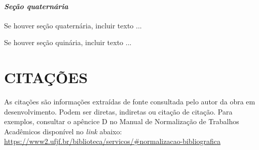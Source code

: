 \documentclass[
  oneside, %
  english,
  brazil
]{abntbibufjf}
\begin{document}









\subsubsection{\textit{Seção quaternária}}

Se houver seção quaternária, incluir texto ...



Se houver seção quinária, incluir texto ...



\chapter{CITAÇÕES}

As citações são informações extraídas de fonte consultada pelo autor da obra em desenvolvimento. Podem ser diretas, indiretas ou citação de citação. Para exemplos, consultar o apêncice D no Manual de Normalização de Trabalhos Acadêmicos disponível no \textit{link} abaixo: \\
\url{https://www2.ufjf.br/biblioteca/servicos/#normalizacao-bibliografica}
\end{document}
